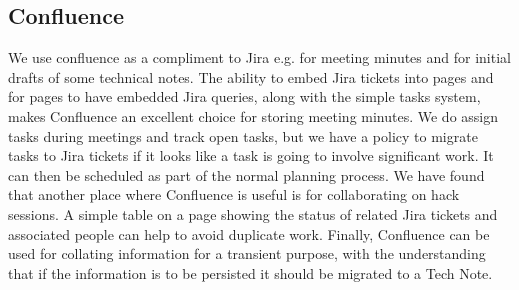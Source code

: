 \subsection{Confluence}
We use confluence  as a compliment to Jira e.g. for meeting minutes and for initial drafts of some technical notes.
The ability to embed Jira tickets into pages and for pages to have embedded Jira queries, along with the simple tasks system, makes Confluence an excellent choice for storing meeting minutes.
We do assign tasks during meetings and track open tasks, but we have a policy to migrate tasks to Jira tickets if it looks like a task is going to involve significant work.
It can then be scheduled as part of the normal planning process.
We have found that another place where Confluence is useful is for collaborating on hack sessions.
A simple table on a page showing the status of related Jira tickets and associated people can help to avoid duplicate work.
Finally, Confluence can be used for collating information for a transient purpose, with the understanding that if the information is to be persisted it should be migrated to a Tech Note.
